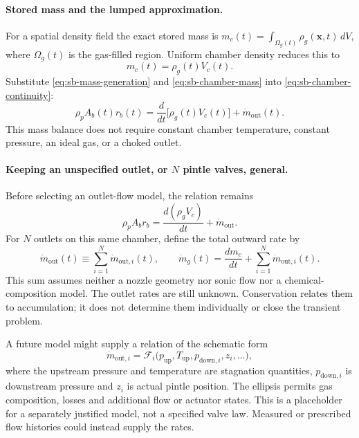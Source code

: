 \paragraph{Stored mass and the lumped approximation.}
For a spatial density field the exact stored mass is
$m_c(t)=\int_{\Omega_g(t)}\rho_g(\mathbf x,t)\,dV$, where
$\Omega_g(t)$ is the gas-filled region. Uniform chamber density reduces
this to
\begin{equation}\label{eq:sb-chamber-mass}
 m_c(t)=\rho_g(t)V_c(t).
\end{equation}
Substitute \eqref{eq:sb-mass-generation} and
\eqref{eq:sb-chamber-mass} into \eqref{eq:sb-chamber-continuity}:
\begin{equation}\label{eq:sb-chamber-product}
 \rho_p A_b(t)r_b(t)
 =\frac{d}{dt}\bigl[\rho_g(t)V_c(t)\bigr]+\dot m_{\mathrm{out}}(t).
\end{equation}
This mass balance does not require constant chamber temperature,
constant pressure, an ideal gas, or a choked outlet.

\paragraph{Keeping an unspecified outlet, or $N$ pintle valves, general.}
Before selecting an outlet-flow model, the relation remains
\[
 \boxed{\rho_p A_b r_b
 =\frac{d(\rho_gV_c)}{dt}+\dot m_{\mathrm{out}}.}
\]
For $N$ outlets on this same chamber, define the total outward rate by
\begin{equation}\label{eq:sb-general-outlets}
 \dot m_{\mathrm{out}}(t)
 \equiv\sum_{i=1}^{N}\dot m_{\mathrm{out},i}(t),
 \qquad
 \dot m_g(t)=\frac{dm_c}{dt}
             +\sum_{i=1}^{N}\dot m_{\mathrm{out},i}(t).
\end{equation}
This sum assumes neither a nozzle geometry nor sonic flow nor a
chemical-composition model. The outlet rates are still unknown.
Conservation relates them to accumulation; it does not determine them
individually or close the transient problem.

A future model might supply a relation of the schematic form
\[
 \dot m_{\mathrm{out},i}
 =\mathcal F_i\bigl(p_{\mathrm{up}},T_{\mathrm{up}},
                   p_{\mathrm{down},i},z_i,\ldots\bigr),
\]
where the upstream pressure and temperature are stagnation quantities,
$p_{\mathrm{down},i}$ is downstream pressure and $z_i$ is actual pintle
position. The ellipsis permits gas composition, losses and additional
flow or actuator states. This is a placeholder for a separately
justified model, not a specified valve law. Measured or prescribed
flow histories could instead supply the rates.

